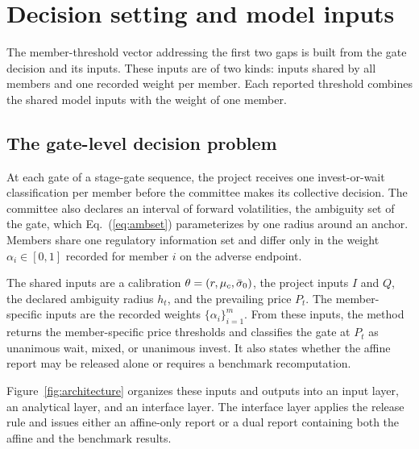 \section{Decision setting and model inputs}

The member-threshold vector addressing the first two gaps is built from the gate decision and its inputs. These inputs are of two kinds: inputs shared by all members and one recorded weight per member. Each reported threshold combines the shared model inputs with the weight of one member.

\subsection{The gate-level decision problem}

At each gate of a stage-gate sequence, the project receives one invest-or-wait classification per member before the committee makes its collective decision. The committee also declares an interval of forward volatilities, the ambiguity set of the gate, which Eq.~(\ref{eq:ambset}) parameterizes by one radius around an anchor. Members share one regulatory information set and differ only in the weight $\alpha_i\in[0,1]$ recorded for member $i$ on the adverse endpoint.

The shared inputs are a calibration $\theta=(r,\mu_c,\bar{\sigma}_0)$, the project inputs $I$ and $Q$, the declared ambiguity radius $h_t$, and the prevailing price $P_t$. The member-specific inputs are the recorded weights $\{\alpha_i\}_{i=1}^{m}$. From these inputs, the method returns the member-specific price thresholds and classifies the gate at $P_t$ as unanimous wait, mixed, or unanimous invest. It also states whether the affine report may be released alone or requires a benchmark recomputation.

Figure~\ref{fig:architecture} organizes these inputs and outputs into an input layer, an analytical layer, and an interface layer. The interface layer applies the release rule and issues either an affine-only report or a dual report containing both the affine and the benchmark results.

